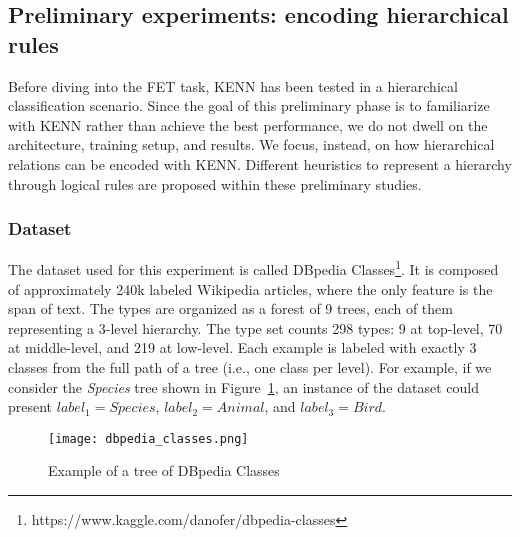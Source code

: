 \subsection{Preliminary experiments: encoding hierarchical rules}
Before diving into the FET task, KENN has been tested in a hierarchical classification scenario. Since the goal of this preliminary phase is to familiarize with KENN rather than achieve the best performance, we do not dwell on the architecture, training setup, and results. We focus, instead, on how hierarchical relations can be encoded with KENN. Different heuristics to represent a hierarchy through logical rules are proposed within these preliminary studies.

\subsubsection{Dataset}

The dataset used for this experiment is called DBpedia Classes\footnote{https://www.kaggle.com/danofer/dbpedia-classes}. It is composed of approximately 240k labeled Wikipedia articles, where the only feature is the span of text. The types are organized as a forest of 9 trees, each of them representing a 3-level hierarchy. The type set counts 298 types: 9 at top-level, 70 at middle-level, and 219 at low-level. Each example is labeled with exactly 3 classes from the full path of a tree (i.e., one class per level). For example, if we consider the \textit{Species} tree shown in Figure~\ref{fig:dbpedia_classes}, an instance of the dataset could present $ label_{1} = Species $, $ label{_2} = Animal $, and $ label_{3} = Bird $.

\begin{figure}[H]
    \centering
    \texttt{[image: dbpedia\_classes.png]}
    \caption{Example of a tree of DBpedia Classes}
    \label{fig:dbpedia_classes}
\end{figure}


